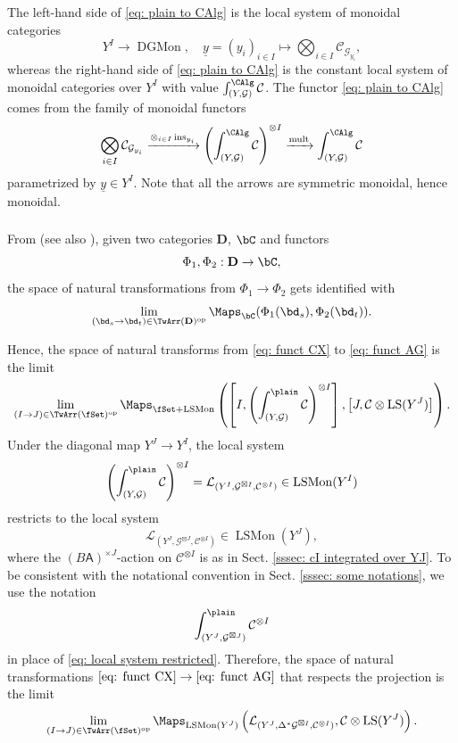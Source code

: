 \documentclass[10pt]{amsart}
\newcommand{\sssec}{\subsubsection}
\theoremstyle{remark}
\newcommand{\ul}{\underline}
\newcommand{\on}{\operatorname}
\newcommand{\cC}{\mathcal{C}}
\newcommand{\cG}{\mathcal{G}}
\newcommand{\cL}{\mathcal{L}}
\newcommand{\LSMon}{\on{LSMon}}
\newcommand{\DGCatMon}{\on{DGMon}}
\newcommand{\LS}{\on{LS}}
\DeclareMathOperator{\op}{op}
\newcommand{\bD}{\mathbf{D}}
\newcommand{\sfA}{\mathsf{A}}
\begin{document}
The left-hand side of \eqref{eq: plain to CAlg} is the local system of monoidal categories
\[Y^I\rightarrow \DGCatMon,\quad \ul{y}=(y_i)_{i\in I}\mapsto \bigotimes_{i\in I}\cC_{\cG_{y_i}},\]
whereas the right-hand side of \eqref{eq: plain to CAlg} is the constant local system of monoidal categories over $Y^I$ with value $\int^{\CAlg}_{(Y,\cG)}\cC$.
The functor \eqref{eq: plain to CAlg} comes from the family of monoidal functors
\[\bigotimes_{i\in I}\cC_{\cG_{y_i}}\xrightarrow{\otimes_{i\in I}\on{ins}_{y_i}} \left(\int^{\CAlg}_{(Y,\cG)}\cC\right)^{\otimes I}\xrightarrow{\on{mult}}\int^{\CAlg}_{(Y,\cG)}\cC\]
parametrized by $\ul{y}\in Y^I$.
Note that all the arrows are symmetric monoidal, hence monoidal.

\sssec{}
    From \cite[Proposition 5.1]{GHN} (see also \cite[Lemma 1.3.12]{GKRV}), given two categories $\bD$, $\bC$ and functors
    \[\Phi_1, \Phi_2: \bD\rightarrow \bC,\]
    the space of natural transformations from $\Phi_1\rightarrow\Phi_2$ gets identified with 
    \[\lim_{(\bd_s\rightarrow \bd_t)\in\TwArr(\bD)^{\op}} \Maps_{\bC}(\Phi_1(\bd_s),\Phi_2(\bd_t)).\]

    Hence, the space of natural transforms from \eqref{eq: funct CX} to \eqref{eq: funct AG} is the limit
    \[\lim_{(I\rightarrow J)\in \TwArr(\fSet)^{\op}} \Maps_{\fSet + \LSMon}\left(\left[I,\left(\int^{\plain}_{(Y,\cG)}\cC\right)^{\otimes I}\right], \left[J, \cC\otimes\LS(Y^J)\right]\right).\]
    Under the diagonal map $Y^J\rightarrow Y^I$, the local system
    \[\left(\int^{\plain}_{(Y,\cG)}\cC\right)^{\otimes I}=\cL_{(Y^I,\cG^{\boxtimes I},\cC^{\otimes I})}\in\LSMon(Y^I)\]
    restricts to the local system
    \begin{equation}\label{eq: local system restricted}
        \cL_{(Y^J,\cG^{\boxtimes J},\cC^{\otimes I})}\in \LSMon(Y^J),
    \end{equation}
    where the $(B\sfA)^{\times J}$-action on $\cC^{\otimes I}$ is as in Sect. \ref{sssec: cI integrated over YJ}. To be consistent with the notational convention in Sect. \ref{sssec: some notations}, we use the notation
    \[\int^{\plain}_{(Y^J,\cG^{\boxtimes J})}\cC^{\otimes I}\]
    in place of \eqref{eq: local system restricted}. Therefore, the space of natural transformations $\eqref{eq: funct CX}\rightarrow \eqref{eq: funct AG}$ that respects the projection is the limit
    \[\lim_{(I\rightarrow J)\in \TwArr(\fSet)^{\op}} \Maps_{\LSMon(Y^J)}\left(\cL_{(Y^J,\Delta^*\cG^{\boxtimes I},\cC^{\otimes I})},  \cC\otimes\LS(Y^J)\right).\]
    
    \medskip
    
\end{document}
